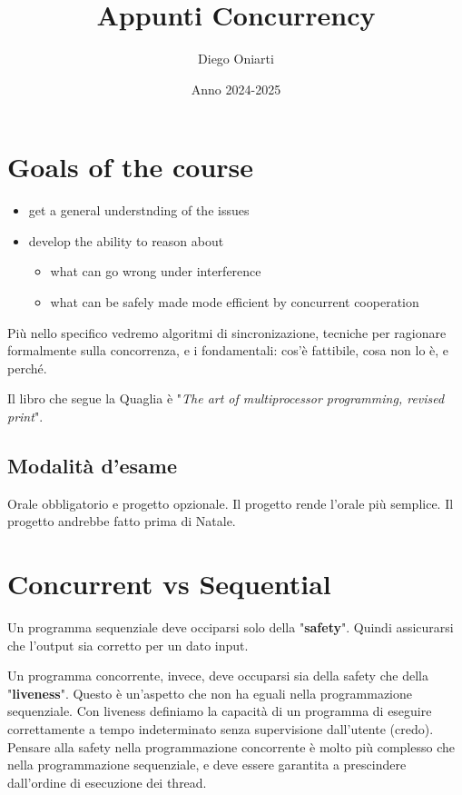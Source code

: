 \documentclass{article}
\title{Appunti Concurrency}
\author{Diego Oniarti}
\date{Anno 2024-2025}
\begin{document}
\maketitle
\tableofcontents

\section{Goals of the course}
\begin{itemize}
    \item get a general understnding of the issues
    \item develop the ability to reason about
        \begin{itemize}
            \item what can go wrong under interference
            \item what can be safely made mode efficient by concurrent cooperation
        \end{itemize}
\end{itemize}
Più nello specifico vedremo algoritmi di sincronizazione, tecniche per ragionare formalmente sulla concorrenza, e i fondamentali:
cos'è fattibile, cosa non lo è, e perché.

Il libro che segue la Quaglia è "\textit{The art of multiprocessor programming, revised print}".

\subsection{Modalità d'esame}
Orale obbligatorio e progetto opzionale. Il progetto rende l'orale più semplice.
Il progetto andrebbe fatto prima di Natale.


\section{Concurrent vs Sequential}
Un programma sequenziale deve occiparsi solo della "\textbf{safety}". Quindi assicurarsi che l'output sia corretto per un dato input. 

Un programma concorrente, invece, deve occuparsi sia della safety che della "\textbf{liveness}". Questo è un'aspetto che non ha eguali nella programmazione sequenziale. Con liveness definiamo la capacità di un programma di eseguire correttamente a tempo indeterminato senza supervisione dall'utente (credo). \\
Pensare alla safety nella programmazione concorrente è molto più complesso che nella programmazione sequenziale, e deve essere garantita a prescindere dall'ordine di esecuzione dei thread.
\end{document}
